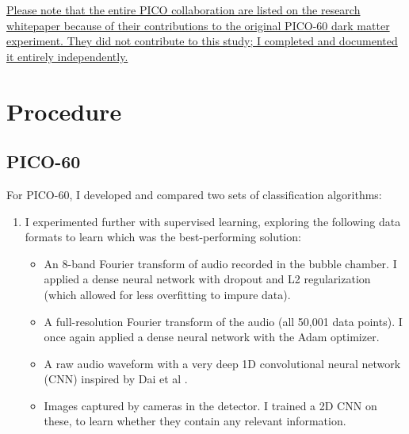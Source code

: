\documentclass[12pt]{article}
\begin{document}
\ul{Please note that the entire PICO collaboration are listed on the research whitepaper because of their contributions to the original PICO-60 dark matter experiment. They did not contribute to this study; I completed and documented it entirely independently.}

\section{Procedure}

\subsection{PICO-60}

For PICO-60, I developed and compared two sets of classification algorithms:

\begin{enumerate}
    \item I experimented further with supervised learning, exploring the following data formats to learn which was the best-performing solution:
    \begin{itemize}
        \item An 8-band Fourier transform of audio recorded in the bubble chamber. I applied a dense neural network with dropout \cite{dropout} and L2 regularization (which allowed for less overfitting to impure data).
        \item A full-resolution Fourier transform of the audio (all 50,001 data points). I once again applied a dense neural network with the Adam \cite{adam} optimizer.
        \item A raw audio waveform with a very deep 1D convolutional neural network (CNN) inspired by Dai et al \cite{verydeepconvnets}.
        \item Images captured by cameras in the detector. I trained a 2D CNN on these, to learn whether they contain any relevant information.
    \end{itemize}
    \begin{figure}[ht]
        \centering

\end{figure}
\end{enumerate}
\end{document}
